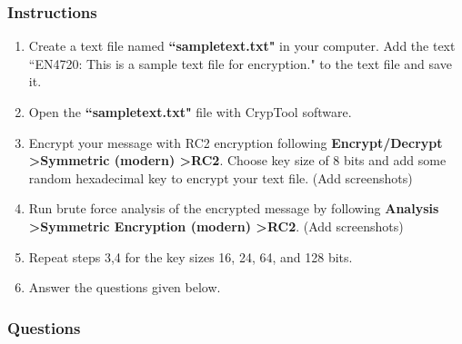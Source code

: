 \documentclass[11pt,letterpaper]{article}
\begin{document}
	\subsubsection*{Instructions}
	\begin{enumerate}
		\item Create a text file named \textbf{``sampletext.txt"} in your computer. Add the text ``EN4720: This is a sample text file for encryption." to the text file and save it.
		\item Open the \textbf{``sampletext.txt"} file with CrypTool software.
		\item Encrypt your message with RC2 encryption following \textbf{Encrypt/Decrypt \textgreater Symmetric (modern) \textgreater RC2}. Choose key size of 8 bits and add some random hexadecimal key to encrypt your text file. (Add screenshots)
		\item Run brute force analysis of the encrypted message by following \textbf{Analysis \textgreater Symmetric Encryption (modern) \textgreater RC2}. (Add screenshots)
		\item Repeat steps 3,4 for the key sizes 16, 24, 64, and 128 bits.
		\item Answer the questions given below.
	\end{enumerate}
	
	\subsubsection*{Questions}
	
\end{document}
